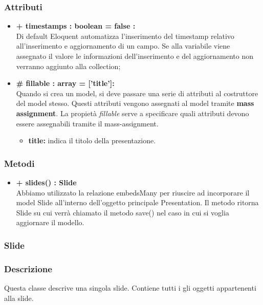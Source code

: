 	\subsubsection*{Attributi}
	\begin{itemize}
		\item \textbf{+ timestamps : boolean = false :}\\
		Di default Eloquent automatizza l'inserimento del timestamp relativo all'inserimento e aggiornamento di un campo. Se alla variabile viene assegnato il valore le informazioni dell'inserimento e del aggiornamento non verranno aggiunto alla collection;
		\item \textbf{\# fillable : array = ['title']:}\\
		Quando si crea un model, si deve passare una serie di attributi al costruttore del model stesso. Questi attributi vengono assegnati al model tramite \textbf{mass assignment}. La propietà \textit{fillable} serve a specificare quali attributi devono essere assegnabili tramite il mass-assignment.
		\begin{itemize}
			\item \textbf{title:} indica il titolo della presentazione.
		\end{itemize}
	\end{itemize}

	\subsubsection*{Metodi}
	\begin{itemize}
		\item \textbf{+ slides() : Slide}\\
		Abbiamo utilizzato la relazione embedsMany per riuscire ad incorporare il model Slide all’interno dell’oggetto principale Presentation. Il metodo ritorna Slide su cui verrà chiamato il metodo save() nel caso in cui si voglia aggiornare il modello.
	\end{itemize}
\newpage

\subsubsection{Slide}


	\subsubsection*{Descrizione}
	Questa classe descrive una singola slide. Contiene tutti i gli oggetti appartenenti alla slide.
	
